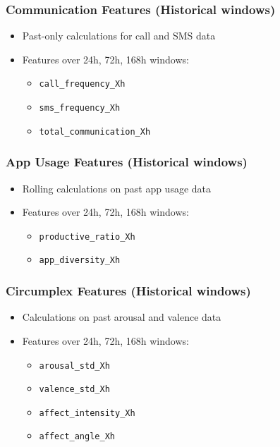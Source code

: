 \documentclass{article}
\begin{document}
\subsubsection{Communication Features (Historical windows)}
\begin{itemize}[noitemsep]
\item Past-only calculations for call and SMS data
\item Features over 24h, 72h, 168h windows:
  \begin{itemize}[noitemsep]
  \item \texttt{call\_frequency\_Xh}
  \item \texttt{sms\_frequency\_Xh}
  \item \texttt{total\_communication\_Xh}
  \end{itemize}
\end{itemize}

\subsubsection{App Usage Features (Historical windows)}
\begin{itemize}[noitemsep]
\item Rolling calculations on past app usage data
\item Features over 24h, 72h, 168h windows:
  \begin{itemize}[noitemsep]
  \item \texttt{productive\_ratio\_Xh}
  \item \texttt{app\_diversity\_Xh}
  \end{itemize}
\end{itemize}

\subsubsection{Circumplex Features (Historical windows)}
\begin{itemize}[noitemsep]
\item Calculations on past arousal and valence data
\item Features over 24h, 72h, 168h windows:
  \begin{itemize}[noitemsep]
  \item \texttt{arousal\_std\_Xh}
  \item \texttt{valence\_std\_Xh}
  \item \texttt{affect\_intensity\_Xh}
  \item \texttt{affect\_angle\_Xh}
  \end{itemize}
\end{itemize}
\end{document}

